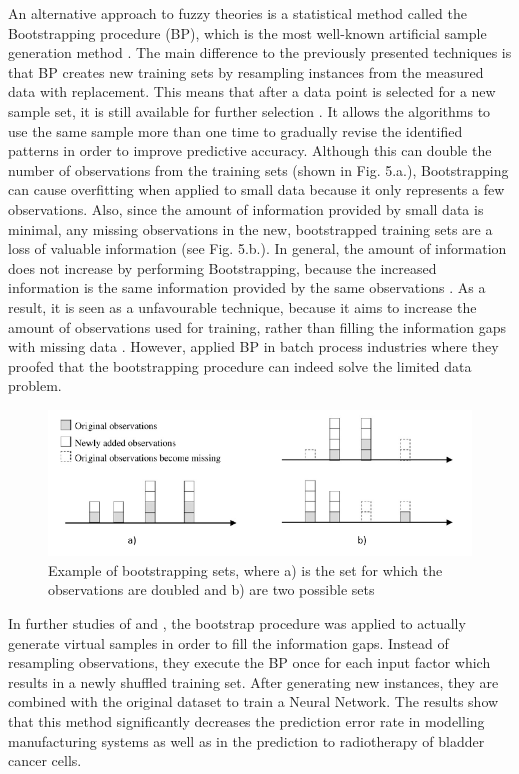 \documentclass[parskip=full]{scrartcl}
\begin{document}
An alternative approach to fuzzy theories is a statistical method called the 
Bootstrapping procedure (BP), which is the most well-known artificial sample 
generation method \cite{AbdulLateh.2017}. The main difference to the previously 
presented techniques is that BP creates new training sets by resampling 
instances from the measured data with replacement. This means that after a data 
point is selected for a new sample set, it is still available for further 
selection \cite{Efron.1993}. It allows the algorithms to use the same sample 
more than one time to gradually revise the identified patterns in order to 
improve predictive accuracy. Although this can double the number of 
observations from the training sets (shown in Fig. 5.a.), Bootstrapping can 
cause overfitting when applied to small data because it only represents a few 
observations. Also, since the amount of information provided by small data is 
minimal, any missing observations in the new, bootstrapped training sets are a 
loss of valuable information (see Fig. 5.b.). In general, the amount of 
information does not increase by performing Bootstrapping, because the 
increased information is the same information provided by the same observations 
\cite{Li.2018}. As a result, it is seen as a unfavourable technique, because it 
aims to increase the amount of observations used for training, rather than 
filling the information gaps with missing data \cite{Tsai.2015}. However, 
\cite{Ivanescu.2006} applied BP in batch process industries where they proofed 
that the bootstrapping procedure can indeed solve the limited data problem.

\begin{figure}[H]
	\centering
	\includegraphics[width=0.9\linewidth]{./resources/bootstrapping_example}
	\caption{Example of bootstrapping sets, where a) is the set for which the 
	observations are doubled and b) are two possible sets}
	\label{fig:bootstrappingexample}
\end{figure}

In further studies of \cite{Tsai.2008} and \cite{Chao.2011}, the bootstrap 
procedure was applied to actually generate virtual samples in order to fill the 
information gaps. Instead of resampling observations, they execute the BP once 
for each input factor which results in a newly shuffled training set. After 
generating new instances, they are combined with the original dataset to train 
a Neural Network. The results show that this method significantly decreases the 
prediction error rate in modelling manufacturing systems as well as in the 
prediction to radiotherapy of bladder cancer cells.
\end{document}
